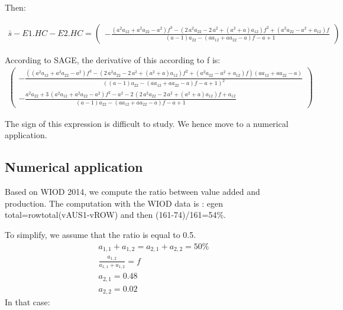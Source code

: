\documentclass[11pt,a4paper]{article}
\begin{document}
\begin{appendices}
Then:

\begin{gather}
\bar{s}-E1.HC-E2.HC=\left(\begin{array}{r}
-\frac{{\left(a^{2} a_{12} + a^{2} a_{22} - a^{2}\right)} f^{3} - {\left(2 \, a^{2} a_{22} - 2 \, a^{2} + {\left(a^{2} + a\right)} a_{12}\right)} f^{2} + {\left(a^{2} a_{22} - a^{2} + a_{12}\right)} f}{{\left(a - 1\right)} a_{22} - {\left(a a_{12} + a a_{22} - a\right)} f - a + 1}
\end{array}\right)
\end{gather}

According to SAGE, the derivative of this according to f is: 
\begin{gather*}
\left(\begin{array}{r}
-\frac{{\left({\left(a^{2} a_{12} + a^{2} a_{22} - a^{2}\right)} f^{3} - {\left(2 \, a^{2} a_{22} - 2 \, a^{2} + {\left(a^{2} + a\right)} a_{12}\right)} f^{2} + {\left(a^{2} a_{22} - a^{2} + a_{12}\right)} f\right)} {\left(a a_{12} + a a_{22} - a\right)}}{{\left({\left(a - 1\right)} a_{22} - {\left(a a_{12} + a a_{22} - a\right)} f - a + 1\right)}^{2}} \\
- \frac{a^{2} a_{22} + 3 \, {\left(a^{2} a_{12} + a^{2} a_{22} - a^{2}\right)} f^{2} - a^{2} - 2 \, {\left(2 \, a^{2} a_{22} - 2 \, a^{2} + {\left(a^{2} + a\right)} a_{12}\right)} f + a_{12}}{{\left(a - 1\right)} a_{22} - {\left(a a_{12} + a a_{22} - a\right)} f - a + 1}
\end{array}\right)
\end{gather*}

The sign of this expression is difficult to study. We hence move to a numerical application.

\subsection{Numerical application}
Based on WIOD 2014, we compute the ratio between value added and production. The computation with the WIOD data is : 
egen total=rowtotal(vAUS1-vROW) and then (161-74)/161=54\%.

To simplify, we assume that the ratio is equal to 0.5.
\begin{gather*}
a_{1,1}+a_{1,2}=a_{2,1}+a_{2,2}=50\% \\
\frac{a_{1,2}}{a_{1,1}+a_{1,2}}=f \\
a_{2,1}=0.48 \\
a_{2,2}=0.02
\end{gather*}
In that case:


\end{appendices}
\end{document}
